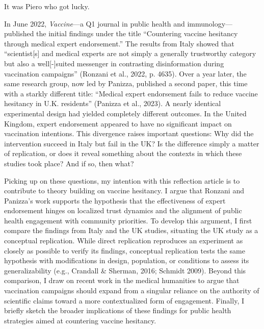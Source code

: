 \documentclass[authordate, reflection,issue]{jote-new-article}
\begin{document}
\vspace{\baselineskip}

	\noindent It was Piero who got lucky.


	\vspace{\baselineskip}




	In June 2022, \emph{Vaccine}—a Q1 journal in public health and immunology—published the initial findings under the title “Countering vaccine hesitancy through medical expert endorsement.” The results from Italy showed that “scientist[s] and medical experts are not simply a generally trustworthy category but also a well[-]suited messenger in contrasting disinformation during vaccination campaigns” (Ronzani et al., 2022, p. 4635). Over a year later, the same research group, now led by Panizza, published a second paper, this time with a starkly different title: “Medical expert endorsement fails to reduce vaccine hesitancy in U.K. residents” (Panizza et al., 2023). A nearly identical experimental design had yielded completely different outcomes. In the United Kingdom, expert endorsement appeared to have no significant impact on vaccination intentions. This divergence raises important questions: Why did the intervention succeed in Italy but fail in the UK? Is the difference simply a matter of replication, or does it reveal something about the contexts in which these studies took place? And if so, then what?







	Picking up on these questions, my intention with this reflection article is to contribute to theory building on vaccine hesitancy. I argue that Ronzani and Panizza's work supports the hypothesis that the effectiveness of expert endorsement hinges on localized trust dynamics and the alignment of public health engagement with community priorities. To develop this argument, I first compare the findings from Italy and the UK studies, situating the UK study as a conceptual replication. While direct replication reproduces an experiment as closely as possible to verify its findings, conceptual replication tests the same hypothesis with modifications in design, population, or conditions to assess its generalizability (e.g., Crandall \& Sherman, 2016; Schmidt 2009). Beyond this comparison, I draw on recent work in the medical humanities to argue that vaccination campaigns should expand from a singular reliance on the authority of scientific claims toward a more contextualized form of engagement. Finally, I briefly sketch the broader implications of these findings for public health strategies aimed at countering vaccine hesitancy.
\end{document}
